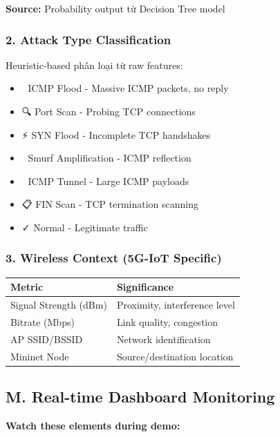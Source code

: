 \documentclass[12pt,a4paper]{article}
\begin{document}
\textbf{Source:} Probability output từ Decision Tree model

\subsubsection{2. Attack Type Classification}

Heuristic-based phân loại từ raw features:

\begin{itemize}
    \item 🌊 ICMP Flood - Massive ICMP packets, no reply
    \item 🔍 Port Scan - Probing TCP connections
    \item ⚡ SYN Flood - Incomplete TCP handshakes
    \item 🔴 Smurf Amplification - ICMP reflection
    \item 🔐 ICMP Tunnel - Large ICMP payloads
    \item 📋 FIN Scan - TCP termination scanning
    \item ✓ Normal - Legitimate traffic
\end{itemize}

\subsubsection{3. Wireless Context (5G-IoT Specific)}

\begin{table}[h]
\centering
\begin{tabularx}{\textwidth}{|l|X|}
\hline
\textbf{Metric} & \textbf{Significance} \\
\hline
Signal Strength (dBm) & Proximity, interference level \\
\hline
Bitrate (Mbps) & Link quality, congestion \\
\hline
AP SSID/BSSID & Network identification \\
\hline
Mininet Node & Source/destination location \\
\hline
\end{tabularx}
\end{table}

\subsection{M. Real-time Dashboard Monitoring}

\textbf{Watch these elements during demo:}
\end{document}
